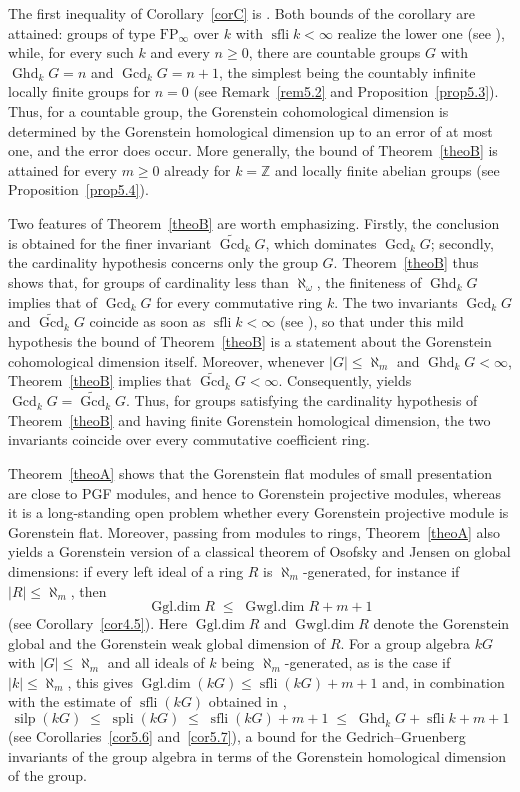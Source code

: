 \documentclass[12pt]{amsart}
\theoremstyle{remark}
\theoremstyle{definition}
\theoremstyle{plain}
\DeclareMathOperator{\Ghd}{Ghd}
\DeclareMathOperator{\Gcd}{Gcd}
\DeclareMathOperator{\sfli}{sfli}
\DeclareMathOperator{\spli}{spli}
\DeclareMathOperator{\silp}{silp}
\DeclareMathOperator{\Gwgl}{Gwgl.dim}
\DeclareMathOperator{\Ggl}{Ggl.dim}
\newcommand{\PGFcd}{\widetilde{\Gcd}}
\newcommand{\Z}{\mathbb{Z}}
\newcommand{\alephm}{\aleph_m}
\begin{document}
The first inequality of Corollary~\ref{corC} is \cite[Theorem~3.10]{KS}. Both bounds of the corollary are attained: groups of type $\mathrm{FP}_\infty$ over $k$ with $\sfli k<\infty$ realize the lower one (see \cite[Theorem~B]{St}), while, for every such $k$ and every $n\ge0$, there are countable groups $G$ with $\Ghd_kG=n$ and $\Gcd_kG=n+1$, the simplest being the countably infinite locally finite groups for $n=0$ (see Remark~\ref{rem5.2} and Proposition~\ref{prop5.3}). Thus, for a countable group, the Gorenstein cohomological dimension is determined by the Gorenstein homological dimension up to an error of at most one, and the error does occur. More generally, the bound of Theorem~\ref{theoB} is attained for every $m\ge0$ already for $k=\Z$ and locally finite abelian groups (see Proposition~\ref{prop5.4}).

Two features of Theorem~\ref{theoB} are worth emphasizing. Firstly, the conclusion is obtained for the finer invariant $\PGFcd_kG$, which dominates $\Gcd_kG$; secondly, the cardinality hypothesis concerns only the group $G$. Theorem~\ref{theoB} thus shows that, for groups of cardinality less than $\aleph_\omega$, the finiteness of $\Ghd_kG$ implies that of $\Gcd_kG$ for every commutative ring $k$. The two invariants $\Gcd_kG$ and $\PGFcd_kG$ coincide as soon as $\sfli k<\infty$ (see \cite[Proposition 2.13]{St0}), so that under this mild hypothesis the bound of Theorem~\ref{theoB} is a statement about the Gorenstein cohomological dimension itself. Moreover, whenever $|G|\le\alephm$ and $\Ghd_kG<\infty$, Theorem~\ref{theoB} implies that $\PGFcd_kG<\infty$.
Consequently, \cite[Corollary~13(ii)]{DE} yields
$\Gcd_kG=\PGFcd_kG$.
Thus, for groups satisfying the cardinality hypothesis of
Theorem~\ref{theoB} and having finite Gorenstein homological dimension,
the two invariants coincide over every commutative
coefficient ring. 

Theorem~\ref{theoA} shows that the Gorenstein flat modules of small presentation are close to PGF modules, and hence to Gorenstein projective modules, whereas it is a long-standing open problem whether every Gorenstein projective module is Gorenstein flat. Moreover,
passing from modules to rings, Theorem~\ref{theoA} also yields a Gorenstein version of a classical theorem of Osofsky and Jensen on global dimensions: if every left ideal of a ring $R$ is $\alephm$-generated, for instance if $|R|\le\alephm$, then
\[
\Ggl R\;\le\;\Gwgl R+m+1
\]
(see Corollary~\ref{cor4.5}). Here $\Ggl R$ and $\Gwgl R$ denote the Gorenstein global and the Gorenstein weak global dimension of $R$. For a group algebra $kG$ with $|G|\le\alephm$ and all ideals of $k$ being $\alephm$-generated, as is the case if $|k|\le\alephm$, this gives $\Ggl(kG)\le\sfli(kG)+m+1$ and, in combination with the estimate of $\sfli(kG)$ obtained in \cite{KS},
\[
\silp(kG)\;\le\;\spli(kG)\;\le\;\sfli(kG)+m+1\;\le\;\Ghd_kG+\sfli k+m+1
\]
(see Corollaries~\ref{cor5.6} and~\ref{cor5.7}), a bound for the Gedrich--Gruenberg invariants of the group algebra in terms of the Gorenstein homological dimension of the group.
\end{document}
